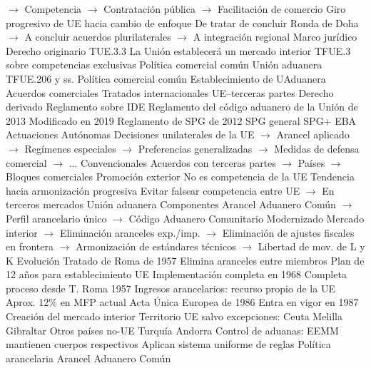 \documentclass{nuevotema}
\begin{document}
\begin{esquemal}
				\4[] $\to$ Competencia
				\4[] $\to$ Contratación pública
				\4[] $\to$ Facilitación de comercio
				\4 Giro progresivo de UE hacia cambio de enfoque
				\4[] De tratar de concluir Ronda de Doha
				\4[] $\to$ A concluir acuerdos plurilaterales
				\4[] $\to$ A integración regional
		\2 Marco jurídico
			\3 Derecho originario
				\4 TUE.3.3
				\4[] La Unión establecerá un mercado interior
				\4 TFUE.3 sobre competencias exclusivas
				\4[] Política comercial común
				\4[] Unión aduanera
				\4 TFUE.206 y ss.
				\4[] Política comercial común
				\4[] Establecimiento de UAduanera
				\4 Acuerdos comerciales
				\4[] Tratados internacionales UE--terceras partes
			\3 Derecho derivado
				\4 Reglamento sobre IDE
				\4 Reglamento del código aduanero de la Unión de 2013
				\4[] Modificado en 2019
				\4 Reglamento de SPG de 2012
				\4[] SPG general
				\4[] SPG+
				\4[] EBA
		\2 Actuaciones
			\3 Autónomas
				\4 Decisiones unilaterales de la UE
				\4[] $\to$ Arancel aplicado
				\4[] $\to$ Regímenes especiales
				\4[] $\to$ Preferencias generalizadas
				\4[] $\to$ Medidas de defensa comercial
				\4[] $\to$ ...
			\3 Convencionales
				\4 Acuerdos con terceras partes
				\4[] $\to$ Países
				\4[] $\to$ Bloques comerciales
			\3 Promoción exterior
				\4 No es competencia de la UE
				\4 Tendencia hacia armonización progresiva
				\4[] Evitar falsear competencia entre UE
				\4[] $\to$ En terceros mercados
	\1 
		\2 Unión aduanera
			\3 Componentes
				\4 Arancel Aduanero Común
				\4[] $\to$ Perfil arancelario único
				\4[] $\to$ Código Aduanero Comunitario Modernizado
				\4 Mercado interior
				\4[] $\to$ Eliminación aranceles exp./imp.
				\4[] $\to$ Eliminación de ajustes fiscales en frontera
				\4[] $\to$ Armonización de estándares técnicos
				\4[] $\to$ Libertad de mov. de L y K
			\3 Evolución
				\4 Tratado de Roma de 1957
				\4[] Elimina aranceles entre miembros
				\4[] Plan de 12 años para establecimiento UE
				\4 Implementación completa en 1968
				\4[] Completa proceso desde T. Roma 1957
				\4 Ingresos arancelarios: recurso propio de la UE
				\4[] Aprox. 12\% en MFP actual
				\4 Acta Única Europea de 1986
				\4[] Entra en vigor en 1987
				\4[] Creación del mercado interior
			\3 Territorio
				\4 UE salvo excepciones:
				\4[] Ceuta
				\4[] Melilla
				\4[] Gibraltar
				\4 Otros países no-UE
				\4[] Turquía
				\4[] Andorra
				\4 Control de aduanas:
				\4[] EEMM mantienen cuerpos respectivos
				\4[] Aplican sistema uniforme de reglas
		\2 Política arancelaria
			\3 Arancel Aduanero Común

\end{esquemal}
\end{document}
